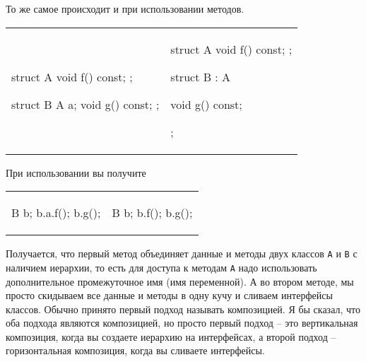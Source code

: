 То же самое происходит и при использовании методов.
\begin{center}
\begin{tabular}{ll}
{
\begin{minipage}[\baselineskip]{7cm}
\begin{cppcode}[numbers = none]
struct A {
  void f() const;
};

struct B {
  A a;
  void g() const;
};
\end{cppcode}
\end{minipage}
}&{
\begin{minipage}[\baselineskip]{7cm}
\begin{cppcode}[numbers = none]
struct A {
  void f() const;
};

struct B : A {

  void g() const;
};
\end{cppcode}
\end{minipage}
}\\
\end{tabular}
\end{center}
При использовании вы получите
\begin{center}
\begin{tabular}{ll}
{
\begin{minipage}[\baselineskip]{7cm}
\begin{cppcode}[numbers = none]
B b;
b.a.f();
b.g();
\end{cppcode}
\end{minipage}
}&{
\begin{minipage}[\baselineskip]{7cm}
\begin{cppcode}[numbers = none]
B b;
b.f();
b.g();
\end{cppcode}
\end{minipage}
}\\
\end{tabular}
\end{center}
Получается, что первый метод объединяет данные и методы двух классов \verb"A" и \verb"B" с наличием иерархии, то есть для доступа к методам \verb"A" надо использовать дополнительное промежуточное имя (имя переменной).
А во втором методе, мы просто скидываем все данные и методы в одну кучу и сливаем интерфейсы классов.
Обычно принято первый подход называть композицией.
Я бы сказал, что оба подхода являются композицией, но просто первый подход -- это вертикальная композиция, когда вы создаете иерархию на интерфейсах, а второй подход -- горизонтальная композиция, когда вы сливаете интерфейсы.

